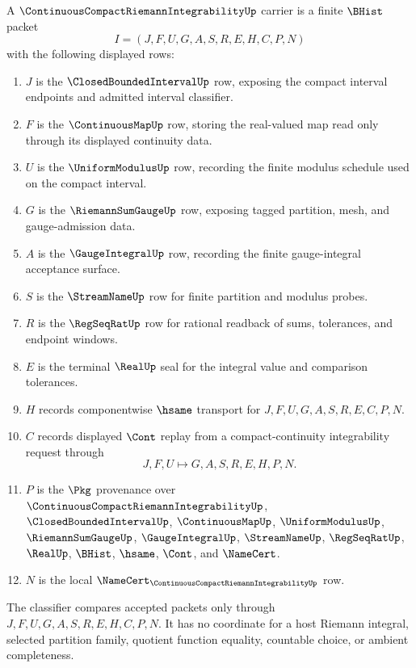 \begin{definition}
\label{def:continuous-compact-riemann-integrability-carrier}
A $\ContinuousCompactRiemannIntegrabilityUp$ carrier is a finite $\BHist$ packet
$$
I=(J,F,U,G,A,S,R,E,H,C,P,N)
$$
with the following displayed rows:
\begin{enumerate}
\item $J$ is the $\ClosedBoundedIntervalUp$ row, exposing the compact interval endpoints and admitted interval classifier.
\item $F$ is the $\ContinuousMapUp$ row, storing the real-valued map read only through its displayed continuity data.
\item $U$ is the $\UniformModulusUp$ row, recording the finite modulus schedule used on the compact interval.
\item $G$ is the $\RiemannSumGaugeUp$ row, exposing tagged partition, mesh, and gauge-admission data.
\item $A$ is the $\GaugeIntegralUp$ row, recording the finite gauge-integral acceptance surface.
\item $S$ is the $\StreamNameUp$ row for finite partition and modulus probes.
\item $R$ is the $\RegSeqRatUp$ row for rational readback of sums, tolerances, and endpoint windows.
\item $E$ is the terminal $\RealUp$ seal for the integral value and comparison tolerances.
\item $H$ records componentwise $\hsame$ transport for $J,F,U,G,A,S,R,E,C,P,N$.
\item $C$ records displayed $\Cont$ replay from a compact-continuity integrability request through
$$
J,F,U \longmapsto G,A,S,R,E,H,P,N .
$$
\item $P$ is the $\Pkg$ provenance over $\ContinuousCompactRiemannIntegrabilityUp$, $\ClosedBoundedIntervalUp$, $\ContinuousMapUp$, $\UniformModulusUp$, $\RiemannSumGaugeUp$, $\GaugeIntegralUp$, $\StreamNameUp$, $\RegSeqRatUp$, $\RealUp$, $\BHist$, $\hsame$, $\Cont$, and $\NameCert$.
\item $N$ is the local $\NameCert_{\ContinuousCompactRiemannIntegrabilityUp}$ row.
\end{enumerate}
The classifier compares accepted packets only through $J,F,U,G,A,S,R,E,H,C,P,N$. It has no coordinate for a host Riemann integral, selected partition family, quotient function equality, countable choice, or ambient completeness.
\end{definition}


